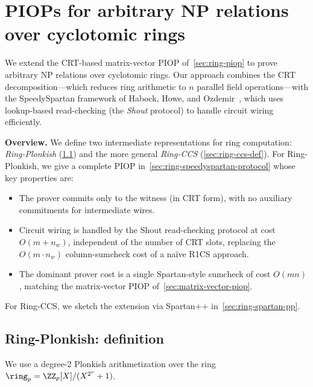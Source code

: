 \section{PIOPs for arbitrary NP relations over cyclotomic rings}
\label{sec:ring-np}

We extend the CRT-based matrix-vector PIOP of~\cref{sec:ring-piop} to prove arbitrary NP relations over cyclotomic rings. Our approach combines the CRT decomposition---which reduces ring arithmetic to $n$ parallel field operations---with the SpeedySpartan framework of Habock, Howe, and Ozdemir~\cite{twist-and-shout}, which uses lookup-based read-checking (the \emph{Shout} protocol) to handle circuit wiring efficiently.

\medskip
\noindent\textbf{Overview.}
We define two intermediate representations for ring computation: \emph{Ring-Plonkish} (\cref{sec:ring-plonkish-def}) and the more general \emph{Ring-CCS} (\cref{sec:ring-ccs-def}).
For Ring-Plonkish, we give a complete PIOP in~\cref{sec:ring-speedyspartan-protocol} whose key properties are:
\begin{itemize}
    \item The prover commits only to the witness (in CRT form), with no auxiliary commitments for intermediate wires.
    \item Circuit wiring is handled by the Shout read-checking protocol at cost $O(m + n_w)$, independent of the number of CRT slots, replacing the $O(m \cdot n_w)$ column-sumcheck cost of a na\"ive R1CS approach.
    \item The dominant prover cost is a single Spartan-style sumcheck of cost $O(mn)$, matching the matrix-vector PIOP of~\cref{sec:matrix-vector-piop}.
\end{itemize}
For Ring-CCS, we sketch the extension via Spartan++ in~\cref{sec:ring-spartan-pp}.


\subsection{Ring-Plonkish: definition}
\label{sec:ring-plonkish-def}

We use a degree-2 Plonkish arithmetization over the ring $\ring_p = \ZZ_p[X]/(X^{2^\nu}+1)$.

